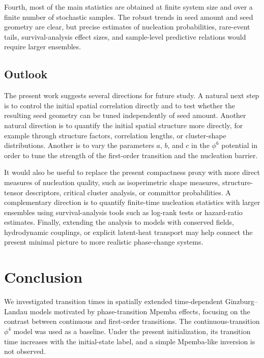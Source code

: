 ﻿\documentclass[aps,pre,preprint,showkeys,amsmath,amssymb,superscriptaddress,longbibliography]{revtex4-2}
\begin{document}
Fourth, most of the main statistics are obtained at finite system size and over a finite number of stochastic samples. The robust trends in seed amount and seed geometry are clear, but precise estimates of nucleation probabilities, rare-event tails, survival-analysis effect sizes, and sample-level predictive relations would require larger ensembles.

\subsection{Outlook}\label{outlook}

The present work suggests several directions for future study. A natural next step is to control the initial spatial correlation directly and to test whether the resulting seed geometry can be tuned independently of seed amount. Another natural direction is to quantify the initial spatial structure more directly, for example through structure factors, correlation lengths, or cluster-shape distributions. Another is to vary the parameters $a$, $b$, and $c$ in the $\phi^6$ potential in order to tune the strength of the first-order transition and the nucleation barrier.

It would also be useful to replace the present compactness proxy with more direct measures of nucleation quality, such as isoperimetric shape measures, structure-tensor descriptors, critical cluster analysis, or committor probabilities. A complementary direction is to quantify finite-time nucleation statistics with larger ensembles using survival-analysis tools such as log-rank tests or hazard-ratio estimates. Finally, extending the analysis to models with conserved fields, hydrodynamic couplings, or explicit latent-heat transport may help connect the present minimal picture to more realistic phase-change systems.

\section{Conclusion}\label{conclusion}

We investigated transition times in spatially extended time-dependent Ginzburg--Landau models motivated by phase-transition Mpemba effects, focusing on the contrast between continuous and first-order transitions. The continuous-transition $\phi^4$ model was used as a baseline. Under the present initialization, its transition time increases with the initial-state label, and a simple Mpemba-like inversion is not observed.
\end{document}
